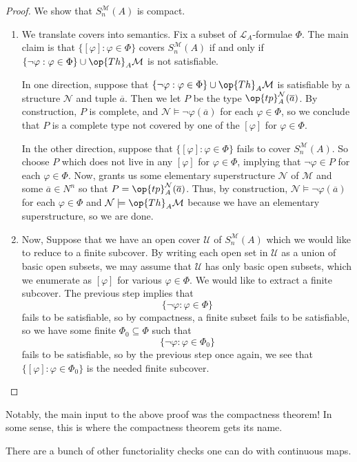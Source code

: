 \documentclass[../notes.tex]{subfiles}
\begin{document}
\begin{proof}
	We show that $S_n^{\mathcal M}(A)$ is compact.
	\begin{enumerate}
		\item We translate covers into semantics. Fix a subset of $\mathcal L_A$-formulae $\Phi$. The main claim is that $\{[\varphi]:\varphi\in\Phi\}$ covers $S_n^{\mathcal M}(A)$ if and only if $\{\lnot\varphi:\varphi\in\Phi\}\cup\op{Th}_A\mathcal M$ is not satisfiable.

		In one direction, suppose that $\{\lnot\varphi:\varphi\in\Phi\}\cup\op{Th}_A\mathcal M$ is satisfiable by a structure $\mathcal N$ and tuple $\overline a$. Then we let $P$ be the type $\op{tp}_A^{\mathcal N}(\overline a)$. By construction, $P$ is complete, and $\mathcal N\models\lnot\varphi(\overline a)$ for each $\varphi\in\Phi$, so we conclude that $P$ is a complete type not covered by one of the $[\varphi]$ for $\varphi\in\Phi$.

		In the other direction, suppose that $\{[\varphi]:\varphi\in\Phi\}$ fails to cover $S_n^{\mathcal M}(A)$. So choose $P$ which does not live in any $[\varphi]$ for $\varphi\in\Phi$, implying that $\lnot\varphi\in P$ for each $\varphi\in\Phi$. Now,  grants us some elementary superstructure $\mathcal N$ of $\mathcal M$ and some $\overline a\in N^n$ so that $P=\op{tp}_A^{\mathcal N}(\overline a)$. Thus, by construction, $\mathcal N\models\lnot\varphi(\overline a)$ for each $\varphi\in\Phi$ and $\mathcal N\models\op{Th}_A\mathcal M$ because we have an elementary superstructure, so we are done.

		\item Now, Suppose that we have an open cover $\mathcal U$ of $S_n^{\mathcal M}(A)$ which we would like to reduce to a finite subcover. By writing each open set in $\mathcal U$ as a union of basic open subsets, we may assume that $\mathcal U$ has only basic open subsets, which we enumerate as $[\varphi]$ for various $\varphi\in\Phi$. We would like to extract a finite subcover. The previous step implies that
		\[\{\lnot\varphi:\varphi\in\Phi\}\]
		fails to be satisfiable, so by compactness, a finite subset fails to be satisfiable, so we have some finite $\Phi_0\subseteq\Phi$ such that
		\[\{\lnot\varphi:\varphi\in\Phi_0\}\]
		fails to be satisfiable, so by the previous step once again, we see that $\{[\varphi]:\varphi\in\Phi_0\}$ is the needed finite subcover.
		\qedhere
	\end{enumerate}
\end{proof}
\begin{remark}
	Notably, the main input to the above proof was the compactness theorem! In some sense, this is where the compactness theorem gets its name.
\end{remark}
There are a bunch of other functoriality checks one can do with continuous maps.
\end{document}
